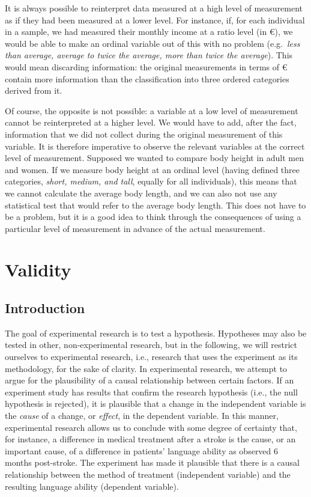 \documentclass[
]{book}
\begin{document}
It is always possible to reinterpret data measured at a high level of measurement as if they had been measured at a lower level. For instance, if, for each individual in a sample, we had measured their monthly income at a ratio level (in €), we would be able to make an ordinal variable out of this with no problem (e.g.~\emph{less than average, average to twice the average, more than twice the average}). This would mean discarding information: the original measurements in terms of € contain more information than the classification into three ordered categories derived from it.

Of course, the opposite is not possible: a variable at a low level of measurement cannot be reinterpreted at a higher level. We would have to add, after the fact, information that we did not collect during the original measurement of this variable. It is therefore imperative to observe the relevant variables at the correct level of measurement. Supposed we wanted to compare body height in adult men and women. If we measure body height at an ordinal level (having defined three categories, \emph{short, medium, and tall}, equally for all individuals), this means that we cannot calculate the average body length, and we can also not use any statistical test that would refer to the average body length. This does not have to be a problem, but it is a good idea to think through the consequences of using a particular level of measurement in advance of the actual measurement.

\hypertarget{ch-validity}{%
\chapter{Validity}\label{ch-validity}}

\hypertarget{introduction-2}{%
\section{Introduction}\label{introduction-2}}

The goal of experimental research is to test a hypothesis. Hypotheses may also be tested in other, non-experimental research, but in the following, we will restrict ourselves to experimental research, i.e., research that uses the experiment as its methodology, for the sake of clarity. In experimental research, we attempt to argue for the plausibility of a causal relationship between certain factors. If an experiment study has results that confirm the research hypothesis (i.e., the null hypothesis is rejected), it is plausible that a change in the independent variable is the \emph{cause} of a change, or \emph{effect}, in the dependent variable. In this manner, experimental research allows us to conclude with some degree of certainty that, for instance, a difference in medical treatment after a stroke is the cause, or an important cause, of a difference in patients' language ability as observed 6 months post-stroke. The experiment has made it plausible that there is a causal relationship between the method of treatment (independent variable) and the resulting language ability (dependent variable).
\end{document}
